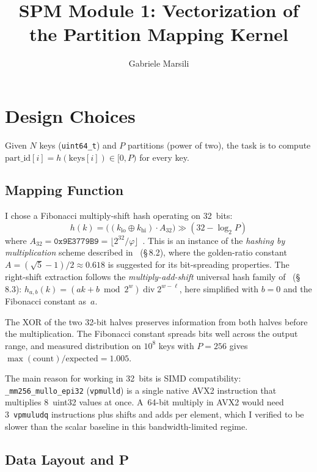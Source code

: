 \documentclass[10pt,a4paper,twocolumn]{article}
\title{\vspace{-1.5em}\textbf{SPM Module 1: Vectorization of the Partition Mapping Kernel}\vspace{-0.5em}}
\author{Gabriele Marsili}
\date{}
\begin{document}
\maketitle
\vspace{-1.5em}

\section{Design Choices}

Given $N$ keys (\texttt{uint64\_t}) and $P$ partitions (power of two), the task is to compute $\text{part\_id}[i] = h(\text{keys}[i]) \in [0,P)$ for every key.

\subsection{Mapping Function}

I chose a Fibonacci multiply-shift hash operating on 32~bits:
$$h(k) = \bigl((k_\text{lo} \oplus k_\text{hi}) \cdot A_{32}\bigr) \gg (32 - \log_2 P)$$
where $A_{32} = \texttt{0x9E3779B9} = \lfloor 2^{32}/\varphi \rfloor$~\cite{knuth1998}.
This is an instance of the \emph{hashing by multiplication} scheme described in~\cite{ferragina2023} (\S\,8.2), where the golden-ratio constant $A = (\sqrt{5}-1)/2 \approx 0.618$ is suggested for its bit-spreading properties. The right-shift extraction follows the \emph{multiply-add-shift} universal hash family of~\cite{ferragina2023} (\S\,8.3): $h_{a,b}(k)=(ak+b \bmod 2^w) \operatorname{div} 2^{w-\ell}$, here simplified with $b\!=\!0$ and the Fibonacci constant as~$a$.

The XOR of the two 32-bit halves preserves information from both halves before the multiplication. The Fibonacci constant spreads bits well across the output range, and measured distribution on $10^8$ keys with $P\!=\!256$ gives $\max(\text{count})/\text{expected} = 1.005$.

The main reason for working in 32~bits is SIMD compatibility: \texttt{\_mm256\_mullo\_epi32} (\texttt{vpmulld}) is a single native AVX2 instruction that multiplies 8~uint32 values at once. A~64-bit multiply in AVX2 would need 3~\texttt{vpmuludq} instructions plus shifts and adds per element, which I verified to be slower than the scalar baseline in this bandwidth-limited regime.

\subsection{Data Layout and P}
\end{document}
